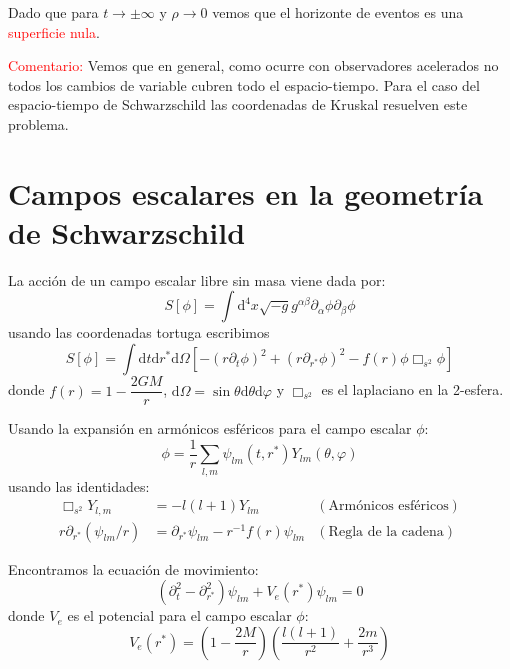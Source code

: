 \documentclass[../main]{subfiles}
\begin{document}
\begin{adjustwidth}{0pt}{-100pt}
Dado que para $t\rightarrow \pm \infty$ y $\rho \rightarrow 0$ vemos que el horizonte de eventos es una \textcolor{red}{superficie nula}.

\textcolor{red}{Comentario:} Vemos que en general, como ocurre con observadores acelerados no todos los cambios de variable cubren todo el espacio-tiempo. Para el caso del espacio-tiempo de Schwarzschild las coordenadas de Kruskal resuelven este problema.

\section{Campos escalares en la geometría de Schwarzschild}\label{part6.2}

La acción de un campo escalar libre sin masa viene dada por:
\begin{equation}
    S[\phi]=\int \mathrm{d}^4 x \sqrt{-g} g^{\alpha\beta}\partial_{\alpha} \phi \partial_{\beta} \phi
\end{equation}
usando las coordenadas tortuga escribimos
\begin{equation}
    S[\phi]=\int \mathrm{d}t\mathrm{d}r^* \mathrm{d}\Omega \left[-(r\partial_t \phi)^2+(r\partial_{r^*} \phi)^2-f(r)\phi \Box_{s^2}\phi \right]
\end{equation}
donde $\displaystyle f(r)=1-\dfrac{2GM}{r}$, $\mathrm{d}\Omega=\sin \theta \mathrm{d}\theta \mathrm{d}\varphi$ y $\Box_{s^2}$ es el laplaciano en la 2-esfera.

Usando la expansión en armónicos esféricos para el campo escalar $\phi$:
\begin{equation}
    \phi=\dfrac{1}{r}\sum_{l, m} \psi_{lm}(t, r^*) Y_{lm}(\theta, \varphi)
\end{equation}
usando las identidades:
\begin{align}
    \Box_{s^2}Y_{l, m}&=-l(l+1)Y_{lm} &(\text{Armónicos esféricos})\\
    r\partial_{r^*}(\psi_{lm}/r)&=\partial_{r^*}\psi_{lm}-r^{-1}f(r)\psi_{lm} &(\text{Regla de la cadena})
\end{align}

Encontramos la ecuación de movimiento:
\begin{equation}
    (\partial^2_t-\partial^2_{r^*})\psi_{lm}+V_e(r^*)\psi_{lm}=0
\end{equation}
donde $V_e$ es el potencial para el campo escalar $\phi$:
\begin{equation}
    V_e(r^*)=\left(1-\dfrac{2M}{r}\right)\left(\dfrac{l(l+1)}{r^2}+\dfrac{2m}{r^3}\right)
\end{equation}


\end{adjustwidth}
\end{document}
